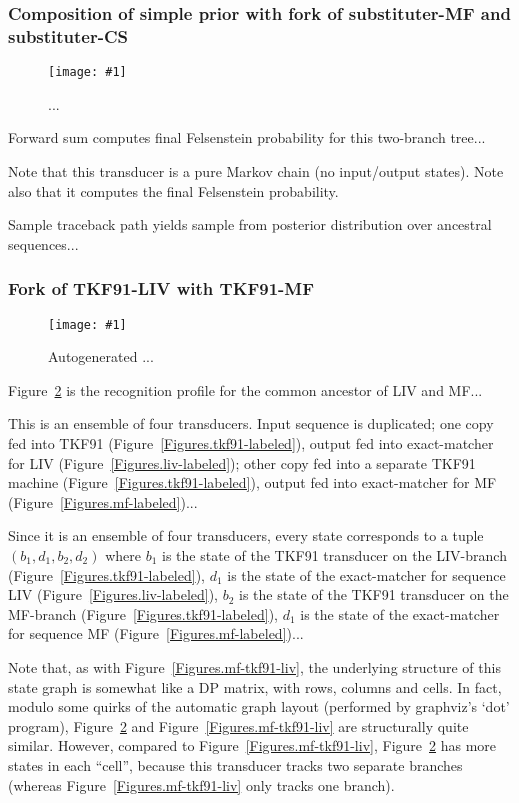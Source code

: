 \documentclass{article}
\newcommand{\figref}[1]{Figure~\ref{Figures.#1}}
\newcommand{\figlabel}[1]{\label{Figures.#1}}
\newcommand{\easyfig}[4]{
\begin{figure}
\texttt{[image: \#1]}
\caption{ \figlabel{#3} #4}
\end{figure}}
\newcommand{\pdffig}[2]{\easyfig{#1-fig.pdf}{}{#1}{#2}}
\newcommand{\widepdffig}[2]{\easyfig{#1-fig.pdf}{width=\textwidth}{#1}{#2}}
\begin{document}
\subsubsection{Composition of simple prior with fork of substituter-MF and substituter-CS}

\pdffig{root-fork-subcs-submf}{...}

Forward sum computes final Felsenstein probability for this two-branch tree...

Note that this transducer is a pure Markov chain (no input/output states).
Note also that it computes the final Felsenstein probability.

Sample traceback path yields sample from posterior distribution over ancestral sequences...

\subsubsection{Fork of TKF91-LIV with TKF91-MF}

\widepdffig{fork-tkf91liv-tkf91mf}{ Autogenerated ...}

\figref{fork-tkf91liv-tkf91mf} is the recognition profile for the common ancestor of LIV and MF...

This is an ensemble of four transducers.
Input sequence is duplicated;
one copy fed into TKF91 (\figref{tkf91-labeled}),
output fed into exact-matcher for LIV (\figref{liv-labeled});
other copy fed into a separate TKF91 machine (\figref{tkf91-labeled}),
output fed into exact-matcher for MF (\figref{mf-labeled})...

Since it is an ensemble of four transducers, every state corresponds to a tuple $(b_1,d_1,b_2,d_2)$
where
$b_1$ is the state of the TKF91 transducer on the LIV-branch (\figref{tkf91-labeled}),
$d_1$ is the state of the exact-matcher for sequence LIV (\figref{liv-labeled}),
$b_2$ is the state of the TKF91 transducer on the MF-branch (\figref{tkf91-labeled}),
$d_1$ is the state of the exact-matcher for sequence MF (\figref{mf-labeled})...

Note that, as with \figref{mf-tkf91-liv},
the underlying structure of this state graph is somewhat like a DP matrix,
with rows, columns and cells.
In fact, modulo some quirks of the automatic graph layout (performed by graphviz's `dot' program),
\figref{fork-tkf91liv-tkf91mf} and \figref{mf-tkf91-liv} are structurally quite similar.
However, compared to \figref{mf-tkf91-liv},
\figref{fork-tkf91liv-tkf91mf} has more states in each ``cell'',
because this transducer tracks two separate branches
(whereas \figref{mf-tkf91-liv} only tracks one branch).
\end{document}
